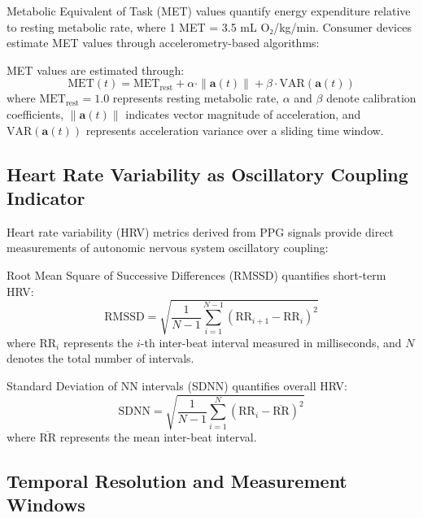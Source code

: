 Metabolic Equivalent of Task (MET) values quantify energy expenditure relative to resting metabolic rate, where 1 MET = 3.5 mL O₂/kg/min. Consumer devices estimate MET values through accelerometry-based algorithms:

\begin{definition}
MET values are estimated through:
\begin{equation}
\text{MET}(t) = \text{MET}_{\text{rest}} + \alpha \cdot \|\mathbf{a}(t)\| + \beta \cdot \text{VAR}(\mathbf{a}(t))
\end{equation}
where $\text{MET}_{\text{rest}} = 1.0$ represents resting metabolic rate, $\alpha$ and $\beta$ denote calibration coefficients, $\|\mathbf{a}(t)\|$ indicates vector magnitude of acceleration, and $\text{VAR}(\mathbf{a}(t))$ represents acceleration variance over a sliding time window.
\end{definition}

\subsection{Heart Rate Variability as Oscillatory Coupling Indicator}

Heart rate variability (HRV) metrics derived from PPG signals provide direct measurements of autonomic nervous system oscillatory coupling:

\begin{definition}
Root Mean Square of Successive Differences (RMSSD) quantifies short-term HRV:
\begin{equation}
\text{RMSSD} = \sqrt{\frac{1}{N-1} \sum_{i=1}^{N-1} (\text{RR}_{i+1} - \text{RR}_i)^2}
\end{equation}
where $\text{RR}_i$ represents the $i$-th inter-beat interval measured in milliseconds, and $N$ denotes the total number of intervals.
\end{definition}

\begin{definition}
Standard Deviation of NN intervals (SDNN) quantifies overall HRV:
\begin{equation}
\text{SDNN} = \sqrt{\frac{1}{N-1} \sum_{i=1}^{N} (\text{RR}_i - \overline{\text{RR}})^2}
\end{equation}
where $\overline{\text{RR}}$ represents the mean inter-beat interval.
\end{definition}

\subsection{Temporal Resolution and Measurement Windows}

